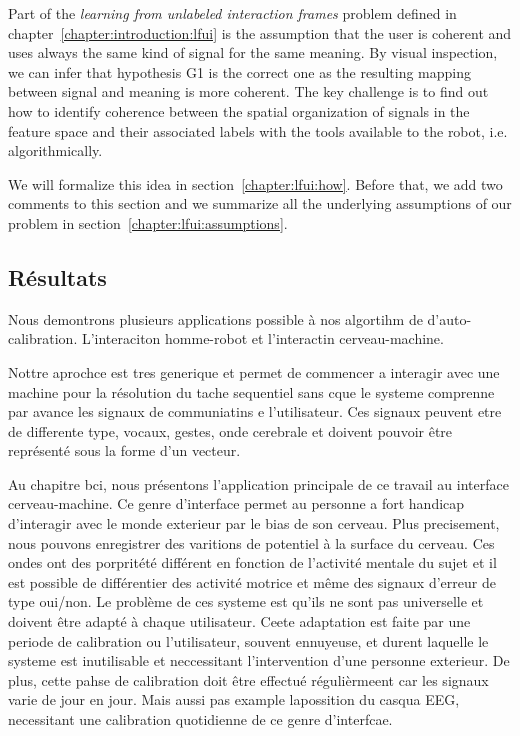 Part of the \emph{learning from unlabeled interaction frames} problem defined in chapter~\ref{chapter:introduction:lfui} is the assumption that the user is coherent and uses always the same kind of signal for the same meaning. By visual inspection, we can infer that hypothesis G1 is the correct one as the resulting mapping between signal and meaning is more coherent. The key challenge is to find out how to identify coherence between the spatial organization of signals in the feature space and their associated labels with the tools available to the robot, i.e. algorithmically.

We will formalize this idea in section~\ref{chapter:lfui:how}. Before that, we add two comments to this section and we summarize all the underlying assumptions of our problem in section~\ref{chapter:lfui:assumptions}.

\subsection*{Résultats}

Nous demontrons plusieurs applications possible à nos algortihm de d'auto-calibration. L'interaciton homme-robot et l'interactin cerveau-machine.

Nottre aprochce est tres generique et permet de commencer a interagir avec une machine pour la résolution du tache sequentiel sans cque le systeme comprenne par avance les signaux de communiatins e l'utilisateur. Ces signaux peuvent etre de differente type, vocaux, gestes, onde cerebrale et doivent pouvoir être représenté sous la forme d'un vecteur.

Au chapitre bci, nous présentons l'application principale de ce travail au interface cerveau-machine. Ce genre d'interface permet au personne a fort handicap d'interagir avec le monde exterieur par le bias de son cerveau. Plus precisement, nous pouvons enregistrer des varitions de potentiel à la surface du cerveau. Ces ondes ont des porpritété différent en fonction de l'activité mentale du sujet et il est possible de différentier des activité motrice et même des signaux d'erreur de type oui/non. Le problème de ces systeme est qu'ils ne sont pas universelle et doivent être adapté à chaque utilisateur. Ceete adaptation est faite par une periode de calibration ou l'utilisateur, souvent ennuyeuse, et durent laquelle le systeme est inutilisable et neccessitant l'intervention d'une personne exterieur. De plus, cette pahse de calibration doit être effectué régulièrmeent car les signaux varie de jour en jour. Mais aussi pas example lapossition du casqua EEG, necessitant une calibration quotidienne de ce genre d'interfcae.

